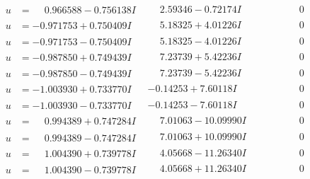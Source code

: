 \documentclass[1p]{elsarticle_modified}
\theoremstyle{definition}
\begin{document}
$$\begin{array}{c|c|c}
\begin{aligned}
u &= \phantom{-}0.966588 - 0.756138 I\end{aligned}
 & \phantom{-}2.59346 - 0.72174 I & \phantom{-0.000000 } 0 \\ \hline\begin{aligned}
u &= -0.971753 + 0.750409 I\end{aligned}
 & \phantom{-}5.18325 + 4.01226 I & \phantom{-0.000000 } 0 \\ \hline\begin{aligned}
u &= -0.971753 - 0.750409 I\end{aligned}
 & \phantom{-}5.18325 - 4.01226 I & \phantom{-0.000000 } 0 \\ \hline\begin{aligned}
u &= -0.987850 + 0.749439 I\end{aligned}
 & \phantom{-}7.23739 + 5.42236 I & \phantom{-0.000000 } 0 \\ \hline\begin{aligned}
u &= -0.987850 - 0.749439 I\end{aligned}
 & \phantom{-}7.23739 - 5.42236 I & \phantom{-0.000000 } 0 \\ \hline\begin{aligned}
u &= -1.003930 + 0.733770 I\end{aligned}
 & -0.14253 + 7.60118 I & \phantom{-0.000000 } 0 \\ \hline\begin{aligned}
u &= -1.003930 - 0.733770 I\end{aligned}
 & -0.14253 - 7.60118 I & \phantom{-0.000000 } 0 \\ \hline\begin{aligned}
u &= \phantom{-}0.994389 + 0.747284 I\end{aligned}
 & \phantom{-}7.01063 - 10.09990 I & \phantom{-0.000000 } 0 \\ \hline\begin{aligned}
u &= \phantom{-}0.994389 - 0.747284 I\end{aligned}
 & \phantom{-}7.01063 + 10.09990 I & \phantom{-0.000000 } 0 \\ \hline\begin{aligned}
u &= \phantom{-}1.004390 + 0.739778 I\end{aligned}
 & \phantom{-}4.05668 - 11.26340 I & \phantom{-0.000000 } 0 \\ \hline\begin{aligned}
u &= \phantom{-}1.004390 - 0.739778 I\end{aligned}
 & \phantom{-}4.05668 + 11.26340 I & \phantom{-0.000000 } 0 \\ \hline\begin{aligned}

\end{aligned}
\end{array}$$
\end{document}
